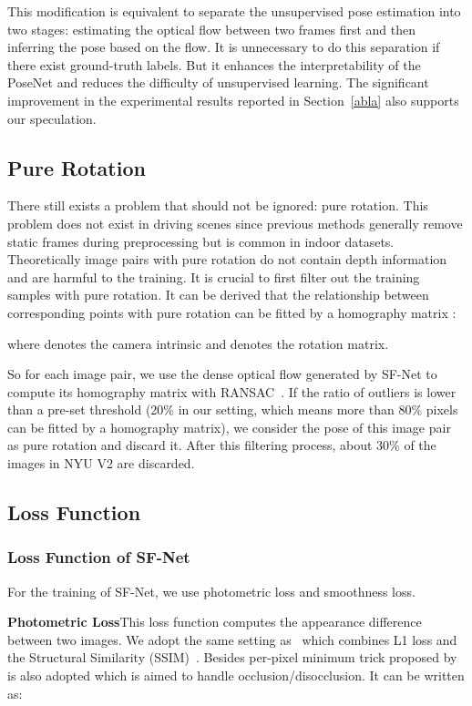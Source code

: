 \documentclass[10pt,twocolumn,letterpaper]{article}
\begin{document}
This modification is equivalent to separate the unsupervised pose estimation into two stages: estimating the optical flow between two frames first and then inferring the pose based on the flow. It is unnecessary to do this separation if there exist ground-truth labels. But it enhances the interpretability of the PoseNet and reduces the difficulty of unsupervised learning. The significant improvement in the experimental results reported in Section~\ref{abla} also supports our speculation.

\subsection{Pure Rotation}
\label{sec:pure}
There still exists a problem that should not be ignored: pure rotation. This problem does not exist in driving scenes since previous methods generally remove static frames during preprocessing but is common in indoor datasets. Theoretically image pairs with pure rotation do not contain depth information and are harmful to the training. It is crucial to first filter out the training samples with pure rotation. It can be derived that the relationship between corresponding points with pure rotation can be fitted by a homography matrix :


where  denotes the camera intrinsic and  denotes the rotation matrix. 

So for each image pair, we use the dense optical flow generated by SF-Net to compute its homography matrix with RANSAC~\cite{fischler1981random}. If the ratio of outliers is lower than a pre-set threshold (20\% in our setting, which means more than 80\% pixels can be fitted by a homography matrix), we consider the pose of this image pair as pure rotation and discard it. After this filtering process, about 30\% of the images in NYU V2 are discarded.

\subsection{Loss Function}

\subsubsection{Loss Function of SF-Net}

\quad For the training of SF-Net, we use photometric loss and smoothness loss.

\textbf{Photometric Loss}\quad This loss function computes the appearance difference between two images. We adopt the same setting as~\cite{godard2017unsupervised} which combines L1 loss and the Structural Similarity (SSIM)~\cite{wang2004image}. Besides per-pixel minimum trick proposed by~\cite{godard2018digging} is also adopted which is aimed to handle occlusion/disocclusion. It can be written as:
\end{document}
